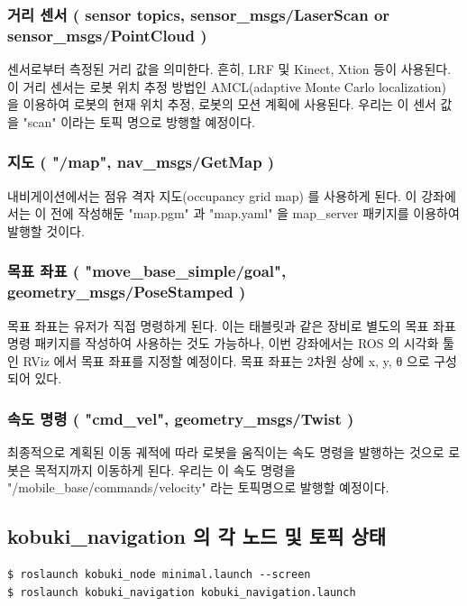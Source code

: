 \subsubsection{거리 센서 ( sensor topics, sensor\_msgs/LaserScan or sensor\_msgs/PointCloud  )}
센서로부터 측정된 거리 값을 의미한다. 흔히, LRF 및 Kinect, Xtion 등이 사용된다. 이 거리 센서는 로봇 위치 추정 방법인 AMCL(adaptive Monte Carlo localization) 을 이용하여 로봇의 현재 위치 추정, 로봇의 모션 계획에 사용된다. 우리는 이 센서 값을 "scan" 이라는 토픽 명으로 방행할 예정이다.

\subsubsection{지도 ( "/map", nav\_msgs/GetMap )}
내비게이션에서는 점유 격자 지도(occupancy grid map) 를 사용하게 된다. 이 강좌에서는 이 전에 작성해둔 "map.pgm" 과 "map.yaml" 을 map\_server 패키지를 이용하여 발행할 것이다. 

\subsubsection{목표 좌표 ( "move\_base\_simple/goal", geometry\_msgs/PoseStamped )}
목표 좌표는 유저가 직접 명령하게 된다. 이는 태블릿과 같은 장비로 별도의 목표 좌표 명령 패키지를 작성하여 사용하는 것도 가능하나, 이번 강좌에서는 ROS 의 시각화 툴인 RViz 에서 목표 좌표를 지정할 예정이다. 목표 좌표는 2차원 상에 x, y, θ 으로 구성되어 있다.

\subsubsection{속도 명령 ( "cmd\_vel", geometry\_msgs/Twist )}
최종적으로 계획된 이동 궤적에 따라 로봇을 움직이는 속도 명령을 발행하는 것으로 로봇은 목적지까지 이동하게 된다. 우리는 이 속도 명령을 "/mobile\_base/commands/velocity" 라는 토픽명으로 발행할 예정이다.


\subsection{kobuki\_navigation 의 각 노드 및 토픽 상태}

\vspace{\baselineskip}
\begin{lstlisting}[language=ROS]
$ roslaunch kobuki_node minimal.launch --screen
$ roslaunch kobuki_navigation kobuki_navigation.launch
\end{lstlisting}

